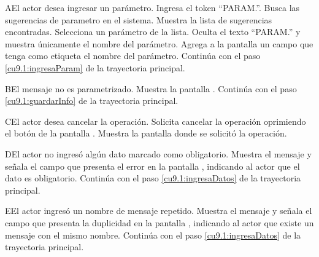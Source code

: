  
 \begin{UCtrayectoriaA}{A}{El actor desea ingresar un parámetro.}
 	 \UCpaso[\UCactor] Ingresa el token ``PARAM.''.
 	\UCpaso[\UCsist] Busca las sugerencias de parametro en el sistema. 
 	\UCpaso[\UCsist] Muestra la lista de sugerencias encontradas.
 	\UCpaso[\UCactor] Selecciona un parámetro de la lista.
  	\UCpaso[\UCsist] Oculta el texto ``PARAM.'' y muestra únicamente el nombre del parámetro.
  	\UCpaso[\UCsist] Agrega a la pantalla un campo que tenga como etiqueta el nombre del parámetro. 
    \UCpaso[] Continúa con el paso \ref{cu9.1:ingresaParam} de la trayectoria principal.
 \end{UCtrayectoriaA}
 \begin{UCtrayectoriaA}{B}{El mensaje no es parametrizado.}
	\UCpaso[\UCsist] Muestra la pantalla .
	\UCpaso[] Continúa con el paso \ref{cu9.1:guardarInfo} de la trayectoria principal.
 \end{UCtrayectoriaA} 
 \begin{UCtrayectoriaA}{C}{El actor desea cancelar la operación.}
    \UCpaso[\UCactor] Solicita cancelar la operación oprimiendo el botón  de la pantalla .
    \UCpaso[\UCsist] Muestra la pantalla donde se solicitó la operación.
 \end{UCtrayectoriaA}
 \begin{UCtrayectoriaA}{D}{El actor no ingresó algún dato marcado como obligatorio.}
    \UCpaso[\UCsist] Muestra el mensaje  y señala el campo que presenta el error en la pantalla 
	    , indicando al actor que el dato es obligatorio.
    \UCpaso[] Continúa con el paso \ref{cu9.1:ingresaDatos} de la trayectoria principal.
 \end{UCtrayectoriaA}
 \begin{UCtrayectoriaA}{E}{El actor ingresó un nombre de mensaje repetido.}
    \UCpaso[\UCsist] Muestra el mensaje  y señala el campo que presenta la duplicidad en la pantalla 
	    , indicando al actor que existe un mensaje con el mismo nombre.
    \UCpaso[] Continúa con el paso \ref{cu9.1:ingresaDatos} de la trayectoria principal.
 \end{UCtrayectoriaA}
 
